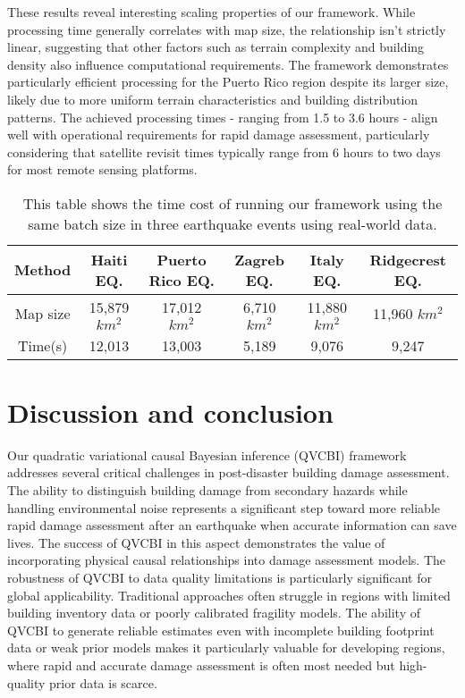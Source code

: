 \documentclass[review]{elsarticle}
\begin{document}
These results reveal interesting scaling properties of our framework. While processing time generally correlates with map size, the relationship isn't strictly linear, suggesting that other factors such as terrain complexity and building density also influence computational requirements. The framework demonstrates particularly efficient processing for the Puerto Rico region despite its larger size, likely due to more uniform terrain characteristics and building distribution patterns. The achieved processing times - ranging from 1.5 to 3.6 hours - align well with operational requirements for rapid damage assessment, particularly considering that satellite revisit times typically range from 6 hours to two days for most remote sensing platforms.

\begin{table}[h]
\centering
\caption{This table shows the time cost of running our framework using the same batch size in three earthquake events using real-world data.}
\begin{tabular}{c|ccccc}
\toprule
\textbf{Method}  & \textbf{Haiti EQ.} & \textbf{ Puerto Rico EQ.} & \textbf{Zagreb EQ.} & \textbf{Italy EQ.} & \textbf{Ridgecrest EQ.}  \\
\hline
Map size & 15,879 $km^2$ & 17,012 $km^2$ &  6,710 $km^2$ & 11,880 $km^2$ & 11,960 $km^2$ \\
Time(s) & 12,013 & 13,003 & 5,189 & 9,076 & 9,247 \\
\bottomrule
\end{tabular}%
\label{table:time}
\end{table}


\section{Discussion and conclusion}

Our quadratic variational causal Bayesian inference (QVCBI) framework addresses several critical challenges in post-disaster building damage assessment. The ability to distinguish building damage from secondary hazards while handling environmental noise represents a significant step toward more reliable rapid damage assessment after an earthquake when accurate information can save lives. The success of QVCBI in this aspect demonstrates the value of incorporating physical causal relationships into damage assessment models. The robustness of QVCBI to data quality limitations is particularly significant for global applicability. Traditional approaches often struggle in regions with limited building inventory data or poorly calibrated fragility models. The ability of QVCBI to generate reliable estimates even with incomplete building footprint data or weak prior models makes it particularly valuable for developing regions, where rapid and accurate damage assessment is often most needed but high-quality prior data is scarce.
\end{document}
